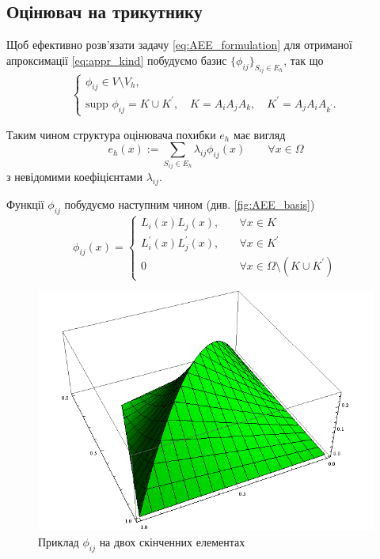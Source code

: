 
\subsection{Оцінювач на трикутнику}

Щоб ефективно розв'язати задачу
\eqref{eq:AEE_formulation} для отриманої апроксимації \eqref{eq:appr_kind} побудуємо базис $\lbrace \phi_{ij} \rbrace_{S_{ij} \in E_h}$, так що
%
\begin{equation}\label{eq:basis_properties}
\begin{cases}
	\phi_{ij} \in V \setminus V_h, \\
	\text{supp } \phi_{ij} = K \cup K^\prime, \quad K = A_iA_jA_k, \quad K^\prime = A_jA_iA_{k^\prime}.
\end{cases}
\end{equation}

Таким чином структура оцінювача похибки $e_h$ має вигляд
%
\begin{equation}
	e_h(x) := \sum \limits_{S_{ij} \in E_h} \lambda_{ij} \phi_{ij}(x) \qquad \forall x \in \Omega
\end{equation}
%
з невідомими коефіцієнтами $\lambda_{ij}$.

Функції $\phi_{ij}$ побудуємо наступним чином (див. \autoref{fig:AEE_basis})
%
\begin{equation}
	\phi_{ij}(x) =
	\begin{cases}
		L_i(x)L_j(x), &\quad \forall x \in K\\
		L_i^\prime(x)L_j^\prime(x), &\quad \forall x \in K^\prime\\
		0 &\quad \forall x \in \Omega \setminus (K \cup K^\prime)
	\end{cases}
\end{equation}
%
\begin{figure}[H]
	\centering
    \includegraphics[scale=0.7]{images/basis}
    \caption{Приклад $\phi_{ij}$ на двох скінченних елементах}
    \label{fig:AEE_basis}
\end{figure}

